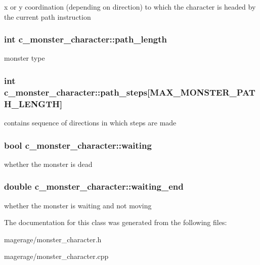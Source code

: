 x or y coordination (depending on direction) to which the character is headed by the current path instruction \hypertarget{classc__monster__character_a2ccaf3ff00ff2370eac007960bd01d7b}{
\subsubsection[{path\-\_\-length}]{\setlength{\rightskip}{0pt plus 5cm}int c\-\_\-monster\-\_\-character\-::path\-\_\-length\hspace{0.3cm}{\ttfamily [protected]}}}\label{classc__monster__character_a2ccaf3ff00ff2370eac007960bd01d7b}
monster type \hypertarget{classc__monster__character_ab4531ab1220b9a52fd07b290350bba05}{
\subsubsection[{path\-\_\-steps}]{\setlength{\rightskip}{0pt plus 5cm}int c\-\_\-monster\-\_\-character\-::path\-\_\-steps\mbox{[}M\-A\-X\-\_\-\-M\-O\-N\-S\-T\-E\-R\-\_\-\-P\-A\-T\-H\-\_\-\-L\-E\-N\-G\-T\-H\mbox{]}\hspace{0.3cm}{\ttfamily [protected]}}}\label{classc__monster__character_ab4531ab1220b9a52fd07b290350bba05}
contains sequence of directions in which steps are made \hypertarget{classc__monster__character_ad751b3e9f92c8b0496bd936c66a7598c}{
\subsubsection[{waiting}]{\setlength{\rightskip}{0pt plus 5cm}bool c\-\_\-monster\-\_\-character\-::waiting\hspace{0.3cm}{\ttfamily [protected]}}}\label{classc__monster__character_ad751b3e9f92c8b0496bd936c66a7598c}
whether the monster is dead \hypertarget{classc__monster__character_a944e8c78c13e1ec2169b59287ea5ef1c}{
\subsubsection[{waiting\-\_\-end}]{\setlength{\rightskip}{0pt plus 5cm}double c\-\_\-monster\-\_\-character\-::waiting\-\_\-end\hspace{0.3cm}{\ttfamily [protected]}}}\label{classc__monster__character_a944e8c78c13e1ec2169b59287ea5ef1c}
whether the monster is waiting and not moving 

The documentation for this class was generated from the following files\-:\begin{DoxyCompactItemize}
\item 
magerage/monster\-\_\-character.\-h\item 
magerage/monster\-\_\-character.\-cpp\end{DoxyCompactItemize}

